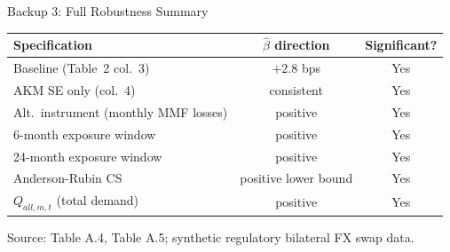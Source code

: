 \documentclass[aspectratio=169, 10pt]{beamer}
\begin{document}
\begin{frame}{Backup 3: Full Robustness Summary}

  \begin{center}
  \begin{tabular}{lcc}
    \toprule
    Specification & $\hat\beta$ direction & Significant? \\
    \midrule
    Baseline (Table~2 col.~3) & $+2.8$ bps & Yes \\
    AKM SE only (col.~4) & consistent & Yes \\
    Alt.\ instrument (monthly MMF losses) & positive & Yes \\
    6-month exposure window & positive & Yes \\
    24-month exposure window & positive & Yes \\
    Anderson-Rubin CS & positive lower bound & Yes \\
    $Q_{all,m,t}$ (total demand) & positive & Yes \\
    \bottomrule
  \end{tabular}
  \end{center}

  {\color{dimgray}\small Source: Table A.4, Table A.5; synthetic regulatory bilateral FX swap data.}

\end{frame}
\end{document}
